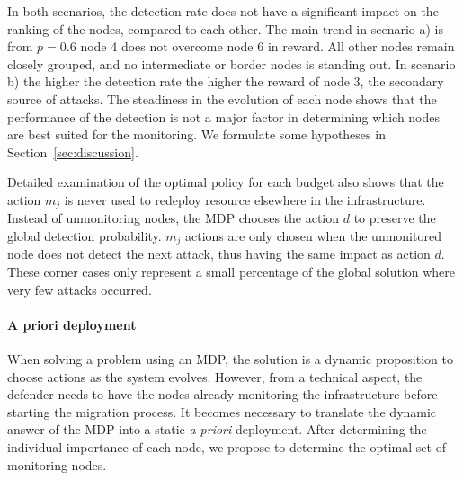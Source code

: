 In both scenarios, the detection rate does not have a significant impact on the ranking of the nodes, compared to each other.
The main trend in scenario a) is from $p=0.6$  node 4 does not overcome node 6 in reward. All other nodes remain closely grouped, and no intermediate or border nodes is standing out.
In scenario b) the higher the detection rate the higher the reward of node 3, the secondary source of attacks.
The steadiness in the evolution of each node shows that the performance of the detection is not a major factor in determining which nodes are best suited for the monitoring. We formulate some hypotheses in Section~\ref{sec:discussion}.

Detailed examination of the optimal policy for each budget also shows that the action $m_j$ is never used to redeploy resource elsewhere in the infrastructure.
Instead of unmonitoring nodes, the MDP chooses the action $d$  to preserve the global detection probability.
$m_j$ actions are only chosen when the unmonitored node does not detect the next attack, thus having the same impact as action $d$. These corner cases only represent a small percentage of the global solution where very few attacks occurred.




\paragraph{A priori deployment}
\label{sec:apriori}
When solving a problem using an MDP, the solution is a dynamic proposition to choose actions as the system evolves.
However, from a technical aspect, the defender needs to have the nodes already monitoring the infrastructure before starting the migration process.
It becomes necessary to translate the dynamic answer of the MDP into a static \textit{a priori} deployment.
After determining the individual importance of each node, we propose to determine the optimal set of monitoring nodes.

